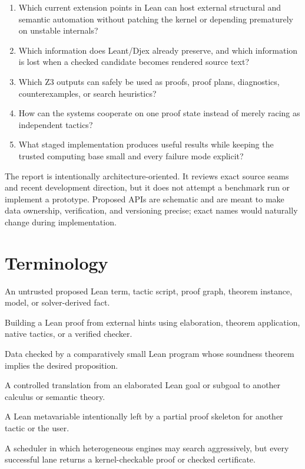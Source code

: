 \documentclass[11pt,letterpaper,openany]{report}
\begin{document}
\begin{enumerate}
  \item Which current extension points in Lean can host external structural and
        semantic automation without patching the kernel or depending prematurely on
        unstable internals?
  \item Which information does Leant/Djex already preserve, and which information is
        lost when a checked candidate becomes rendered source text?
  \item Which Z3 outputs can safely be used as proofs, proof plans, diagnostics,
        counterexamples, or search heuristics?
  \item How can the systems cooperate on one proof state instead of merely racing as
        independent tactics?
  \item What staged implementation produces useful results while keeping the trusted
        computing base small and every failure mode explicit?
\end{enumerate}

The report is intentionally architecture-oriented. It reviews exact source seams and
recent development direction, but it does not attempt a benchmark run or implement a
prototype. Proposed APIs are schematic and are meant to make data ownership,
verification, and versioning precise; exact names would naturally change during
implementation.

\section{Terminology}

\begin{description}[style=nextline,leftmargin=1.8em]
  \item[Candidate] An untrusted proposed Lean term, tactic script, proof graph, theorem
        instance, model, or solver-derived fact.
  \item[Reconstruction] Building a Lean proof from external hints using elaboration,
        theorem application, native tactics, or a verified checker.
  \item[Certificate] Data checked by a comparatively small Lean program whose
        soundness theorem implies the desired proposition.
  \item[Projection] A controlled translation from an elaborated Lean goal or subgoal
        to another calculus or semantic theory.
  \item[Residual goal] A Lean metavariable intentionally left by a partial proof
        skeleton for another tactic or the user.
  \item[Proof-producing portfolio] A scheduler in which heterogeneous engines may
        search aggressively, but every successful lane returns a kernel-checkable
        proof or checked certificate.
\end{description}
\end{document}
